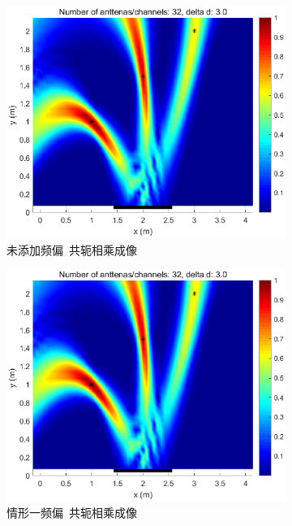 \begin{figure}[H]
\begin{subfigure}[t]{.3\linewidth}
    \centering
    \includegraphics[width=1\textwidth]{figures/compare/CM_without_freq.eps}
    \caption{未添加频偏~共轭相乘成像}
  \end{subfigure}
  \begin{subfigure}[t]{.3\linewidth}
    \centering
    \includegraphics[width=1\textwidth]{figures/compare/CM_freq1.eps}
    \caption{情形一频偏~共轭相乘成像}
  \end{subfigure}
  \begin{subfigure}[t]{.3\linewidth}
    \centering

\end{subfigure}
\end{figure}
